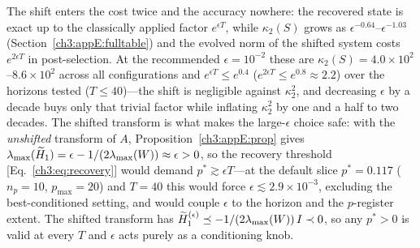 The shift enters the cost twice and the accuracy nowhere: the
recovered state is exact up to the classically applied factor
$e^{\epsilon T}$, while $\kappa_2(S)$ grows as
$\epsilon^{-0.64}$--$\epsilon^{-1.03}$
(Section~\ref{ch3:appE:fulltable}) and the evolved norm of the shifted system
costs $e^{2\epsilon T}$ in post-selection.  At the recommended
$\epsilon=10^{-2}$ these are $\kappa_2(S)=4.0\times10^{2}$--$8.6
\times10^{2}$ across all configurations and
$e^{\epsilon T}\le e^{0.4}$ ($e^{2\epsilon T}\le e^{0.8}\approx2.2$)
over the horizons tested ($T\le40$)---the shift is negligible against
$\kappa_2^{2}$, and decreasing $\epsilon$ by a decade buys only that
trivial factor while inflating $\kappa_2^{2}$ by one and a half to two
decades.  The shifted transform is what makes the large-$\epsilon$
choice safe: with the \emph{unshifted} transform of $A$,
Proposition~\ref{ch3:appE:prop} gives
$\lambda_{\max}(\widetilde{H}_1)=\epsilon-1/(2\lambda_{\max}(W))\approx\epsilon>0$, so the
recovery threshold [Eq.~\eqref{ch3:eq:recovery}] would demand
$p^{*}\gtrsim\epsilon T$---at the default slice $p^{*}=0.117$
($n_p=10$, $p_{\max}=20$) and $T=40$ this would force
$\epsilon\lesssim2.9\times10^{-3}$, excluding the best-conditioned
setting, and would couple $\epsilon$ to the horizon and the
$p$-register extent.  The shifted transform has
$\widetilde{H}_1^{(\epsilon)}\preceq-1/(2\lambda_{\max}(W))\,I\prec0$, so any $p^{*}>0$ is
valid at every $T$ and $\epsilon$ acts purely as a conditioning knob.
